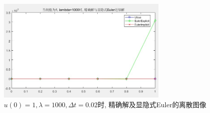 \documentclass[12pt]{article}
\begin{document}
\begin{figure}[H]
	\centering
	\includegraphics[width=0.75\textwidth]{13}
	\caption{$u(0)=1, \lambda=1000,\Delta{t}=0.02$时, 精确解及显隐式Euler的离散图像}
\end{figure}
\quad \\
\quad \\
\end{document}
